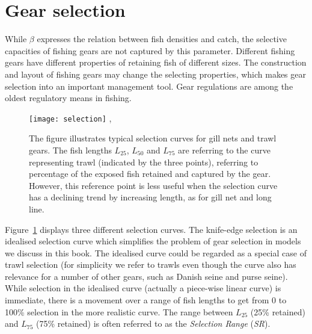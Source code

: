 \documentclass[11pt,fleqn]{book} %
\begin{document}
\section{Gear selection}
While $\beta$ expresses the relation between fish densities and catch, the selective capacities of fishing gears are not captured by this parameter. Different fishing gears have different properties of retaining fish of different sizes. The construction and layout of fishing gears may change the selecting properties, which makes gear selection into an important management tool. Gear regulations are among the oldest regulatory means in fishing.

\begin{figure}[ht]
\centering\texttt{[image: selection]}
,\caption{The figure illustrates typical selection curves for gill nets and trawl gears. The fish lengths $L_{25}$, $L_{50}$ and $L_{75}$ are referring to the curve representing trawl (indicated by the three points), referring to percentage of the exposed fish retained and captured by the gear. However, this reference point is less useful when the selection curve has a declining trend by increasing length, as for gill net and long line. }
\label{fig:selection}
\end{figure}

Figure~\ref{fig:selection} displays three different selection curves. The knife-edge selection is an idealised selection curve which simplifies the problem of gear selection in models we discuss in this book. The idealised curve could be regarded as a special case of trawl selection (for simplicity we refer to trawls even though the curve also has relevance for a number of other gears, such as Danish seine and purse seine). While selection in the idealised curve (actually a piece-wise linear curve) is immediate, there is a movement over a range of fish lengths to get from 0 to 100\% selection in the more realistic curve. The range between $L_{25}$ (25\% retained) and $L_{75}$ (75\% retained) is often referred to as the \textit{Selection Range} (\textit{SR}).
\end{document}
